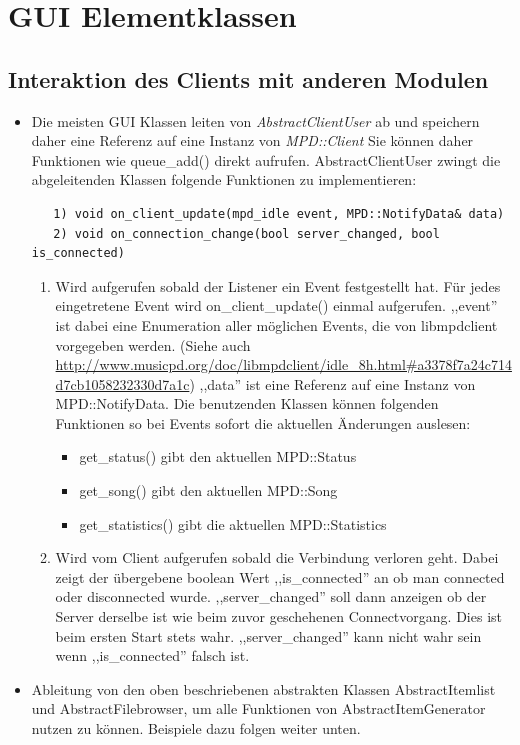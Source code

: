 \section{GUI Elementklassen}
\subsection{Interaktion des Clients mit anderen Modulen}
\begin{itemize}
\item Die meisten GUI Klassen leiten von \emph{AbstractClientUser} ab und speichern daher eine Referenz auf eine Instanz von \emph{MPD::Client}
      Sie können daher Funktionen wie queue\_add() direkt aufrufen.
      AbstractClientUser zwingt die abgeleitenden Klassen folgende Funktionen zu implementieren: 
\begin{verbatim} 
   1) void on_client_update(mpd_idle event, MPD::NotifyData& data)
   2) void on_connection_change(bool server_changed, bool is_connected)
\end{verbatim}
   \begin{enumerate}
   \item Wird aufgerufen sobald der Listener ein Event festgestellt hat. Für jedes eingetretene Event wird on\_client\_update()    
   einmal aufgerufen. ,,event'' ist dabei eine Enumeration aller möglichen Events, die von libmpdclient 
   vorgegeben werden. (Siehe auch \url{http://www.musicpd.org/doc/libmpdclient/idle\_8h.html#a3378f7a24c714d7cb1058232330d7a1c})
   ,,data'' ist eine Referenz auf eine Instanz von MPD::NotifyData. Die benutzenden Klassen können folgenden Funktionen so
   bei Events sofort die aktuellen Änderungen auslesen:
   \begin{itemize} 
     \item get\_status() gibt den aktuellen MPD::Status
     \item get\_song() gibt den aktuellen MPD::Song
     \item get\_statistics() gibt die aktuellen MPD::Statistics
   \end{itemize} 
   \item Wird vom Client aufgerufen sobald die Verbindung verloren geht.
         Dabei zeigt der übergebene boolean Wert ,,is\_connected'' an ob man connected oder disconnected wurde.
         ,,server\_changed'' soll dann anzeigen ob der Server derselbe ist wie beim zuvor geschehenen Connectvorgang.
         Dies ist beim ersten Start stets wahr. ,,server\_changed'' kann nicht wahr sein wenn ,,is\_connected'' falsch ist.
   \end{enumerate}
\item Ableitung von den oben beschriebenen abstrakten Klassen AbstractItemlist und AbstractFilebrowser, um alle Funktionen von AbstractItemGenerator nutzen zu können. Beispiele dazu folgen weiter unten.
\end{itemize}


